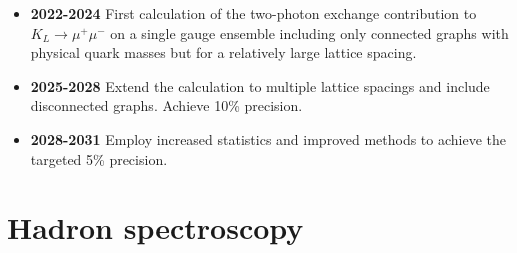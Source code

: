 \documentclass[12pt,hyperpdf]{article}
\begin{document}
\begin{itemize}
\begin{itemize}
    \item{\bf 2022-2024} First calculation of the two-photon exchange contribution 
    to $K_L\to\mu^+ \mu^-$ on a single gauge ensemble including only connected 
    graphs with physical quark masses but for a relatively large lattice spacing.
    \item{\bf 2025-2028} Extend the calculation to multiple lattice spacings and include 
    disconnected graphs.  Achieve 10\% precision.
    \item{\bf 2028-2031} Employ increased statistics and improved methods to 
    achieve the targeted 5\% precision.
\end{itemize}
\end{itemize}
 
\section{Hadron spectroscopy}\label{sec:hadspec}

\end{document}
